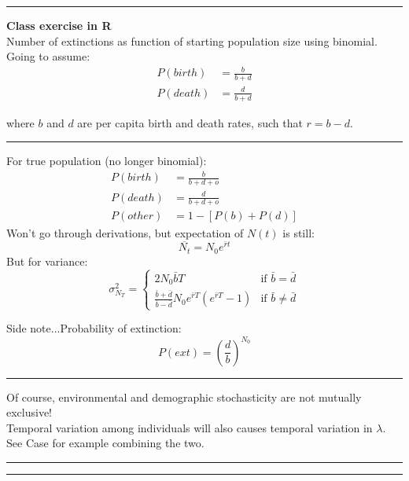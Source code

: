 \documentclass{article}
\begin{document}
\rule[0.5ex]{\linewidth}{1pt}
\textbf{Class exercise in R}\\
Number of extinctions as function of starting population size using binomial.\\
Going to assume:
\begin{align*}
	P(birth)&=\frac{b}{b+d}\\
	P(death)&=\frac{d}{b+d}
\end{align*}
\begin{center}
	where $b$ and $d$ are per capita birth and death rates, such that $r=b-d$.
\end{center}

\rule[0.5ex]{\linewidth}{1pt}
For true population (no longer binomial):
\begin{align*}
	P(birth)&=\frac{b}{b+d+o}\\
	P(death)&=\frac{d}{b+d+o}\\
	P(other)&=1-[P(b)+P(d)]
\end{align*}
Won't go through derivations, but expectation of $N(t)$ is still:
\begin{equation*}
	\overline{N_t}=N_0 e^{\bar{r}t}
\end{equation*}
But for variance:
\begin{equation*}
  \sigma_{N_T}^2 =
  \begin{cases} 
        2N_0 \bar{b} T & \text{if } \bar{b}=\bar{d} \\
        \frac{\bar{b}+\bar{d}}{\bar{b}-\bar{d}} N_0 e^{\bar{r}T}(e^{\bar{r}T}-1) & \text{if } \bar{b} \neq \bar{d}
    \end{cases}
 \end{equation*}

Side note...Probability of extinction:
\begin{equation*}
	P(ext)=\left(\frac{d}{b}\right)^{N_0}
\end{equation*}

\rule[0.5ex]{\linewidth}{1pt}
Of course, environmental and demographic stochasticity are not mutually exclusive!\\  
Temporal variation among individuals will also causes temporal variation in $\lambda$.\\
See Case for example combining the two.

\rule[0.5ex]{\linewidth}{1pt}
\rule[0.5ex]{\linewidth}{1pt}
\end{document}
